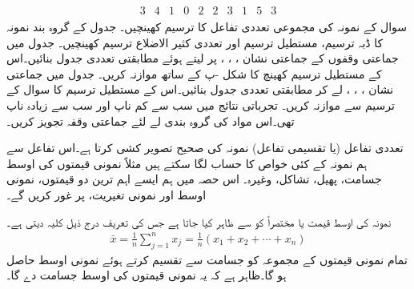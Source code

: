 \begin{align*}
\begin{array}{rrrrrrrrrr}
3&4&1&0&2&2&3&1&5&3
\end{array}
\end{align*}
\quad
سوال  کے نمونہ کی مجموعی تعددی تفاعل کا ترسیم کھینچیں۔
\quad
جدول  کے گروہ بند نمونہ کا ڈبہ ترسیم، مستطیل ترسیم اور تعددی کثیر الاضلاع ترسیم کھینچیں۔ 
\quad
جدول  میں جماعتی وقفوں کے جماعتی نشان ، ، ،  پر لیتے ہوئے مطابقتی تعددی جدول بنائیں۔اس کے مستطیل ترسیم کھینچ کا شکل -پ کے ساتھ موازنہ کریں۔
\quad
جدول  میں جماعتی نشان ، ، ،  لے کر مطابقتی تعددی جدول بنائیں۔اس کے مستطیل ترسیم کا سوال  کے ترسیم سے موازنہ کریں۔  
\quad
{} تجرباتی نتائج میں سب سے کم ناپ  اور سب سے زیادہ ناپ  تھی۔اس مواد کی گروہ بندی لے لئے جماعتی وقفہ تجویز کریں۔

تعددی تفاعل (یا تقسیمی تفاعل) نمونہ کی صحیح تصویر کشی کرتا ہے۔اس تفاعل سے ہم نمونہ کے کئی خواص کا حساب لگا سکتے ہیں مثلاً نمونی قیمتوں کی اوسط جسامت، پھیل، تشاکل، وغیرہ۔ اس حصہ میں ہم ایسے اہم ترین دو قیمتوں، نمونی اوسط اور نمونی تغیریت، پر غور کریں گے۔

نمونہ  کی اوسط قیمت یا مختصراً  کو  سے ظاہر کیا جاتا ہے جس کی تعریف درج ذیل کلیہ دیتی ہے۔
\begin{align}\label{مساوات_شماریات_نمونی_اوسط_الف}
\bar{x}=\frac{1}{n}\sum_{j=1}^{n}x_j=\frac{1}{n}(x_1+x_2+\cdots+x_n)
\end{align}
تمام نمونی قیمتوں کے مجموعہ کو جسامت  سے تقسیم کرتے ہوئے نمونی اوسط حاصل ہو گا۔ظاہر ہے کہ یہ نمونی قیمتوں کی اوسط جسامت دے گا۔

